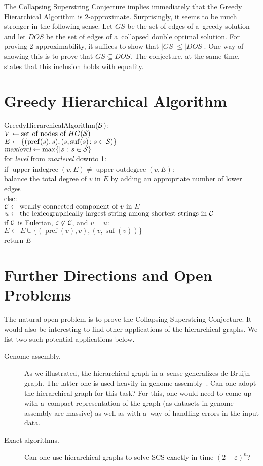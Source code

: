 \documentclass[11pt,letterpaper]{article}
\begin{document}
The Collapsing Superstring Conjecture implies immediately that the Greedy
Hierarchical Algorithm is 2-approximate. Surprisingly, it seems to be much
stronger in the following sense. Let $GS$ be the set of edges of a~greedy
solution and let $DOS$ be the set of edges of a~collapsed double optimal
solution. For proving 2-approximability, it suffices to show that $|GS| \le |DOS|$. 
One way of showing this is to prove that $GS \subseteq DOS$. 
The conjecture, at the same time, states that this inclusion holds with equality.

\clearpage
\section{Greedy Hierarchical Algorithm}
{\sc GreedyHierarchicalAlgorithm}(${\cal S}$):\\
$V \gets \text{set of nodes of $HG({\cal S})$}$\\
$E \gets \{(\operatorname{pref}(s), s), (s, \operatorname{suf}(s) \colon s \in {\cal S})\}$\\
$\textsl{maxlevel} \gets \max\{|s| \colon s \in {\cal S}\}$\\
for \textsl{level} from \textsl{maxlevel} downto 1:\\
\null\quad if $\operatorname{upper-indegree}(v, E) \neq \operatorname{upper-outdegree}(v, E)$:\\
\null\quad\quad balance the total degree of $v$ in $E$ by adding an appropriate number of lower edges \\
\null\quad else:\\
\null\quad\quad ${\cal C} \gets \text{weakly connected component of $v$ in $E$}$\\
\null\quad\quad $u \gets \text{the lexicographically largest string among shortest strings in ${\cal C}$}$\\
\null\quad\quad if ${\cal C}$ is Eulerian, $\varepsilon \not \in {\cal C}$, and $v = u$:\\
\null\quad\quad\quad $E \gets E \cup \{(\operatorname{pref}(v), v), (v, \operatorname{suf}(v))\}$\\
return $E$

\section{Further Directions and Open Problems}
The natural open problem is to prove the Collapsing Superstring Conjecture.
It would also be interesting to find other applications of the 
hierarchical graphs. We list two such potential applications below.
\begin{description}
\item[Genome assembly.] As we illustrated, the hierarchical graph in a~sense
generalizes de Bruijn graph. The latter one is used heavily 
in genome assembly~\cite{}.
Can one adopt the hierarchical graph for this task? For this, one
would need to come up with a~compact representation of the graph
(as datasets in genome assembly are massive) as well as with a~way of
handling errors in the input data.

\item[Exact algorithms.] Can one use hierarchical graphs to solve SCS exactly in time $(2-\varepsilon)^n$?
\end{description}
\end{document}
